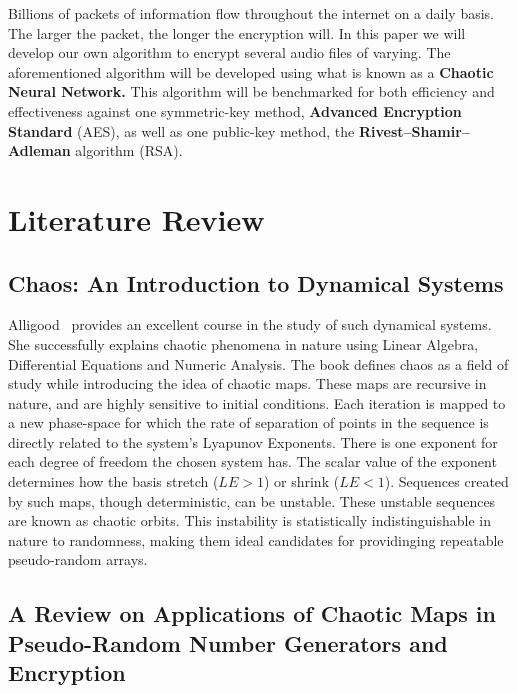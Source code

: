 \documentclass[conference]{IEEEtran}
\begin{document}
Billions of packets of information flow throughout the internet on a daily basis.
The larger the packet, the longer the encryption will.
In this paper we will develop our own algorithm to encrypt several audio files of varying.
The aforementioned algorithm will be developed using what is known as a \textbf{Chaotic Neural Network.}
This algorithm will be benchmarked for both efficiency and effectiveness against one symmetric-key method, \textbf{Advanced Encryption Standard} (AES), as well as one public-key method, the \textbf{Rivest–Shamir–Adleman} algorithm (RSA).

\section{Literature Review}\label{sec:literature-review}

\subsection{\textbf{Chaos: An Introduction to Dynamical Systems}}\label{subsec:chaos:-an-introduction-to-dynamical-systems}

Alligood~\cite{Alligood} provides an excellent course in the study of such dynamical systems.
She successfully explains chaotic phenomena in nature using Linear Algebra, Differential Equations and Numeric Analysis.
The book defines chaos as a field of study while introducing the idea of chaotic maps.
These maps are recursive in nature, and are highly sensitive to initial conditions.
Each iteration is mapped to a new phase-space for which the rate of separation of points in the sequence is directly related to the system's Lyapunov Exponents.
There is one exponent for each degree of freedom the chosen system has.
The scalar value of the exponent determines how the basis stretch ($LE > 1$) or shrink ($LE < 1$).
Sequences created by such maps, though deterministic, can be unstable.
These unstable sequences are known as chaotic orbits.
This instability is statistically indistinguishable in nature to randomness, making them ideal candidates for providinging repeatable pseudo-random arrays.

\subsection{\textbf{A Review on Applications of Chaotic Maps in Pseudo-Random Number Generators and Encryption}}\label{subsec:a-review-on-applications-of-chaotic-maps-in-pseudo-random-number-generators-and-encryption}
\cite{Naik2022}
\end{document}
